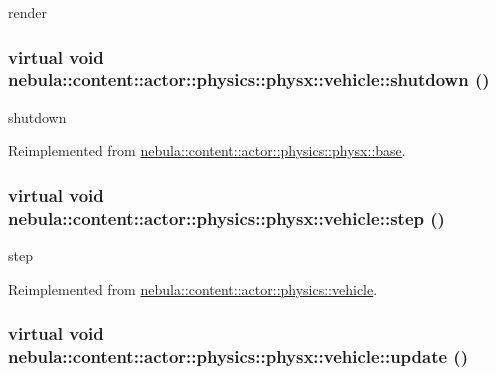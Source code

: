 render \hypertarget{classnebula_1_1content_1_1actor_1_1physics_1_1physx_1_1vehicle_afbebdaf2bcdf945a57f77b8d8e402667}{
\subsubsection[{shutdown}]{\setlength{\rightskip}{0pt plus 5cm}virtual void nebula::content::actor::physics::physx::vehicle::shutdown ()}}
\label{classnebula_1_1content_1_1actor_1_1physics_1_1physx_1_1vehicle_afbebdaf2bcdf945a57f77b8d8e402667}


shutdown 

Reimplemented from \hyperlink{classnebula_1_1content_1_1actor_1_1physics_1_1physx_1_1base_a35c49f55a68b66eb88f46a8916f54d4c}{nebula::content::actor::physics::physx::base}.\hypertarget{classnebula_1_1content_1_1actor_1_1physics_1_1physx_1_1vehicle_aedbb25e6286bbe59c90a6f5df29abc2b}{
\subsubsection[{step}]{\setlength{\rightskip}{0pt plus 5cm}virtual void nebula::content::actor::physics::physx::vehicle::step ()}}
\label{classnebula_1_1content_1_1actor_1_1physics_1_1physx_1_1vehicle_aedbb25e6286bbe59c90a6f5df29abc2b}


step 

Reimplemented from \hyperlink{classnebula_1_1content_1_1actor_1_1physics_1_1vehicle_aa91fc65d0e5ad3c55de9af1dc4fb3c59}{nebula::content::actor::physics::vehicle}.\hypertarget{classnebula_1_1content_1_1actor_1_1physics_1_1physx_1_1vehicle_ab9d5ea43fc0c5dbafb6bc9c014b68a56}{
\subsubsection[{update}]{\setlength{\rightskip}{0pt plus 5cm}virtual void nebula::content::actor::physics::physx::vehicle::update ()}}
\label{classnebula_1_1content_1_1actor_1_1physics_1_1physx_1_1vehicle_ab9d5ea43fc0c5dbafb6bc9c014b68a56}


